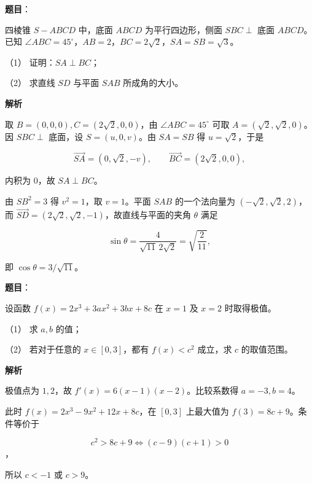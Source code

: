 \begin{answer}

\textbf{题目}：

四棱锥 $S-ABCD$ 中，底面 $ABCD$ 为平行四边形，侧面 $SBC\perp$ 底面 $ABCD$。已知 $\angle ABC=45^\circ$，$AB=2$，$BC=2\sqrt2$，$SA=SB=\sqrt3$。
\nopagebreak[4]
\begin{center}\end{center}
\nopagebreak[4]
（1） 证明：$SA\perp BC$；

（2） 求直线 $SD$ 与平面 $SAB$ 所成角的大小。

\textbf{解析}


取 $B=(0,0,0),C=(2\sqrt2,0,0)$，由 $\angle ABC=45^\circ$ 可取 $A=(\sqrt2,\sqrt2,0)$。因 $SBC\perp$ 底面，设 $S=(u,0,v)$。由 $SA=SB$ 得 $u=\sqrt2$，于是

\nopagebreak[4]
\[
\overrightarrow{SA}=(0,\sqrt2,-v),\qquad
\overrightarrow{BC}=(2\sqrt2,0,0),
\]

内积为 $0$，故 $SA\perp BC$。


由 $SB^2=3$ 得 $v^2=1$，取 $v=1$。平面 $SAB$ 的一个法向量为 $(-\sqrt2,\sqrt2,2)$，而 $\overrightarrow{SD}=(2\sqrt2,\sqrt2,-1)$，故直线与平面的夹角 $\theta$ 满足

\nopagebreak[4]
\[
\sin\theta=\frac{4}{\sqrt{11}\,2\sqrt2}=\sqrt{\frac2{11}},
\]

即 $\cos\theta=3/\sqrt{11}$。



\end{answer}
\begin{answer}

\textbf{题目}：

设函数 $f(x)=2x^3+3ax^2+3bx+8c$ 在 $x=1$ 及 $x=2$ 时取得极值。

（1） 求 $a,b$ 的值；

（2） 若对于任意的 $x\in[0,3]$，都有 $f(x)<c^2$ 成立，求 $c$ 的取值范围。

\textbf{解析}


极值点为 $1,2$，故 $f'(x)=6(x-1)(x-2)$。比较系数得 $a=-3,b=4$。


此时 $f(x)=2x^3-9x^2+12x+8c$，在 $[0,3]$ 上最大值为 $f(3)=8c+9$。条件等价于

\nopagebreak[4]
\[
c^2>8c+9\Longleftrightarrow(c-9)(c+1)>0
\]
，

所以 $c<-1$ 或 $c>9$。



\end{answer}
